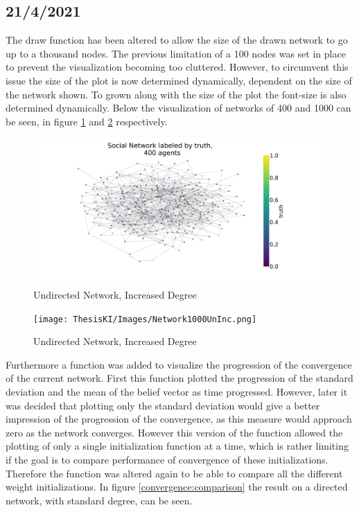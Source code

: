\documentclass{article}
\begin{document}
\subsection{21/4/2021}

The draw function has been altered to allow the size of the drawn network to go up to a thousand nodes. The previous limitation of a 100 nodes was set in place to prevent the visualization becoming too cluttered. However, to circumvent this issue the size of the plot is now determined dynamically, dependent on the size of the network shown. To grown along with the size of the plot the font-size is also determined dynamically. Below the visualization of networks of 400 and 1000 can be seen, in figure \ref{network_400:increased} and \ref{network_1000:increased} respectively.
\begin{center}
    \begin{figure}[!htbp]
        \centering
        \includegraphics[width=.8\textwidth]{ThesisKI/Images/Network400UnInc.png}
        \caption{Undirected Network, Increased Degree}
        \label{network_400:increased}
    \end{figure}
\end{center}

\begin{center}
    \begin{figure}[!htbp]
        \centering
        \texttt{[image: ThesisKI/Images/Network1000UnInc.png]}
        \caption{Undirected Network, Increased Degree}
        \label{network_1000:increased}
    \end{figure}
\end{center}

\newpage

Furthermore a function was added to visualize the progression of the convergence of the current network. First this function plotted the progression of the standard deviation and the mean of the belief vector as time progressed. However, later it was decided that plotting only the standard deviation would give a better impression of the progression of the convergence, as this measure would approach zero as the network converges. However this version of the function allowed the plotting of only a single initialization function at a time, which is rather limiting if the goal is to compare performance of convergence of these initializations. Therefore the function was altered again to be able to compare all the different weight initializations. In figure \ref{convergence:comparison} the result on a directed network, with standard degree, can be seen.
\end{document}
